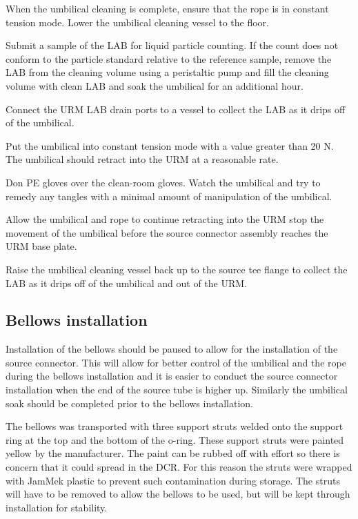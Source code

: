 \documentclass[11pt]{article}
\begin{document}
\begin{answerlist}
\item When the umbilical cleaning is complete, ensure that the rope is in constant tension mode. Lower the umbilical cleaning vessel to the floor.
\item Submit a sample of the LAB for liquid particle counting. If the count does not conform to the particle standard relative to the reference sample, remove the LAB from the cleaning volume using a peristaltic pump and fill the cleaning volume with clean LAB and soak the umbilical for an additional hour. 
\item Connect the URM LAB drain ports to a vessel to collect the LAB as it drips off of the umbilical.
\item Put the umbilical into constant tension mode with a value greater than 20 N. The umbilical should retract into the URM at a reasonable rate.
\item Don PE gloves over the clean-room gloves. Watch the umbilical and try to remedy any tangles with a minimal amount of manipulation of the umbilical.
\item Allow the umbilical and rope to continue retracting into the URM stop the movement of the umbilical before the source connector assembly reaches the URM base plate.
\item Raise the umbilical cleaning vessel back up to the source tee flange to collect the LAB as it drips off of the umbilical and out of the URM.
\end{answerlist}
  

\subsection{Bellows installation}\label{sss:BellowsInstall}
Installation of the bellows should be paused to allow for the
installation of the source connector. This will allow for better
control of the umbilical and the rope during the bellows installation
and it is easier to conduct the source connector installation when the
end of the source tube is higher up. Similarly the umbilical soak
should be completed prior to the bellows installation.

The bellows was transported with three support struts welded onto the
support ring at the top and the bottom of the o-ring. These support
struts were painted yellow by the manufacturer. The paint can be
rubbed off with effort so there is concern that it could spread in the
DCR. For this reason the struts were wrapped with JamMek plastic to prevent
such contamination during storage. The struts will have to be removed
to allow the bellows to be used, but will be kept through installation
for stability.
\end{document}
